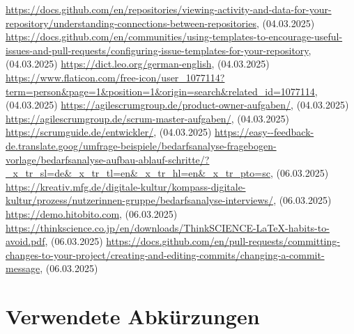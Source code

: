 \renewcommand\bibname{Quellenverzeichnis}
\begin{thebibliography}{9}
     \url{https://docs.github.com/en/repositories/viewing-activity-and-data-for-your-repository/understanding-connections-between-repositories}, (04.03.2025)
     \url{https://docs.github.com/en/communities/using-templates-to-encourage-useful-issues-and-pull-requests/configuring-issue-templates-for-your-repository}, (04.03.2025)
     \url{https://dict.leo.org/german-english}, (04.03.2025)
     \url{https://www.flaticon.com/free-icon/user_1077114?term=person&page=1&position=1&origin=search&related_id=1077114}, (04.03.2025)
     \url{https://agilescrumgroup.de/product-owner-aufgaben/}, (04.03.2025)
     \url{https://agilescrumgroup.de/scrum-master-aufgaben/}, (04.03.2025)
     \url{https://scrumguide.de/entwickler/}, (04.03.2025)
     \url{https://easy--feedback-de.translate.goog/umfrage-beispiele/bedarfsanalyse-fragebogen-vorlage/bedarfsanalyse-aufbau-ablauf-schritte/?_x_tr_sl=de&_x_tr_tl=en&_x_tr_hl=en&_x_tr_pto=sc}, (06.03.2025)
     \url{https://kreativ.mfg.de/digitale-kultur/kompass-digitale-kultur/prozess/nutzerinnen-gruppe/bedarfsanalyse-interviews/}, (06.03.2025)
     \url{https://demo.hitobito.com}, (06.03.2025)
     \url{https://thinkscience.co.jp/en/downloads/ThinkSCIENCE-LaTeX-habits-to-avoid.pdf}, (06.03.2025)
     \url{https://docs.github.com/en/pull-requests/committing-changes-to-your-project/creating-and-editing-commits/changing-a-commit-message}, (06.03.2025)
    
\end{thebibliography}

\chapter{Verwendete Abkürzungen}

